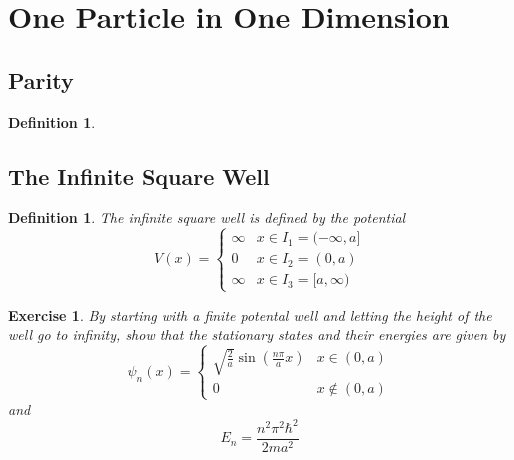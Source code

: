 \documentclass[12pt]{amsart}
\newtheorem{defn}[thm]{Definition}
\newtheorem{ex}[thm]{Exercise}
\begin{document}
	
	
	
	
	
	\newpage
	
	





\newpage





\section{One Particle in One Dimension}

\subsection{Parity}

\begin{defn}
	
\end{defn}

\subsection{The Infinite Square Well}

\begin{defn}
The infinite square well is defined by the potential 
\[
V(x) = 
\begin{cases}
\infty & x \in I_1 = (-\infty, a]\\
0 & x \in I_2 = (0,a)\\
\infty &x \in I_3 = [a,\infty)
\end{cases}
\]
\end{defn}

\begin{ex}
By starting with a finite potental well and letting the height of the well go to infinity, show that the stationary states and their  energies are given by $$\psi_n(x)= 
\begin{cases}
\sqrt{\frac{2}{a}}\sin(\frac{n \pi}{a}x)  & x \in (0,a) \\
0 & x \not \in (0,a)
\end{cases} $$ 
and 
$$E_n = \frac{n^2 \pi^2 \hbar^2}{2ma^2}$$
\end{ex}
\end{document}
